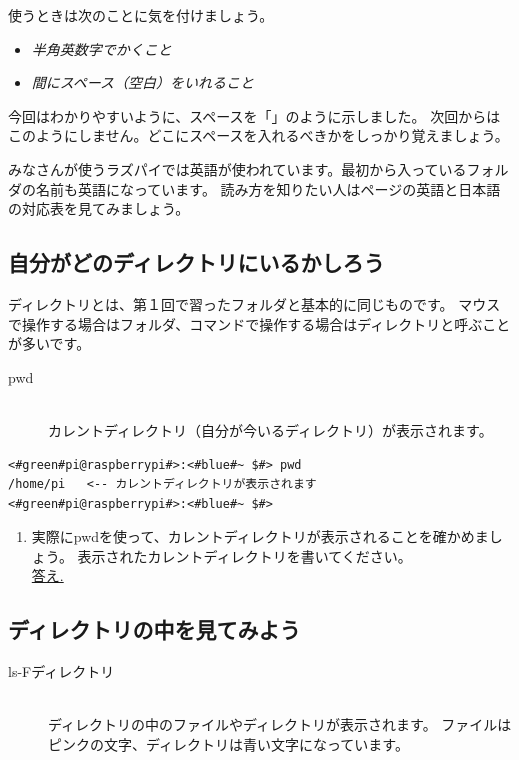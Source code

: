 使うときは次のことに気を付けましょう。
\begin{itemize}
\item \emph{半角英数字でかくこと}
\item \emph{間にスペース（空白）をいれること}
\end{itemize}

今回はわかりやすいように、スペースを「\textvisiblespace 」のように示しました。
次回からはこのようにしません。どこにスペースを入れるべきかをしっかり覚えましょう。

みなさんが使うラズパイでは英語が使われています。最初から入っているフォルダの名前も英語になっています。
読み方を知りたい人は\pageref{英語と日本語の対応表}ページの英語と日本語の対応表を見てみましょう。

\subsection{自分がどのディレクトリにいるかしろう}
ディレクトリとは、第１回で習ったフォルダと基本的に同じものです。
マウスで操作する場合はフォルダ、コマンドで操作する場合はディレクトリと呼ぶことが多いです。

\begin{description}
\item[pwd]\mbox{}\\
 カレントディレクトリ（自分が今いるディレクトリ）が表示されます。
\end{description}

\begin{lstlisting}[caption=pwdコマンドの例,label=pwdtest]
<#green#pi@raspberrypi#>:<#blue#~ $#> pwd
/home/pi   <-- カレントディレクトリが表示されます
<#green#pi@raspberrypi#>:<#blue#~ $#>
\end{lstlisting}

\begin{tcolorbox}[title=\useOmetoi]
\begin{enumerate}
 \item 実際にpwdを使って、カレントディレクトリが表示されることを確かめましょう。
 表示されたカレントディレクトリを書いてください。\\
\underline{答え.\hspace{0.8\linewidth}}
\end{enumerate}
\end{tcolorbox}



\subsection{ディレクトリの中を見てみよう}
\begin{description}
\item[ls\textvisiblespace -F\textvisiblespace ディレクトリ]\mbox{}\\
ディレクトリの中のファイルやディレクトリが表示されます。
ファイルはピンクの文字、ディレクトリは青い文字になっています。
\end{description}

